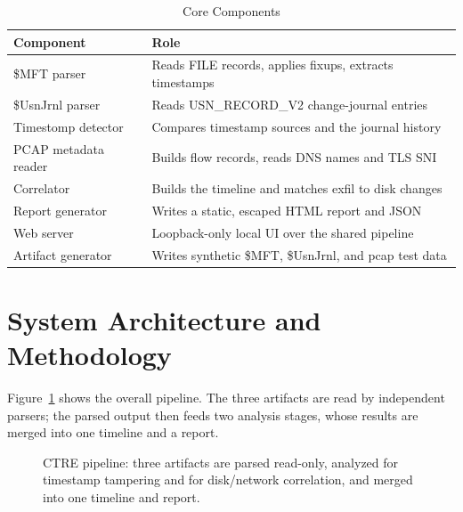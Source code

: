 \documentclass[12pt,onecolumn]{IEEEtran}
\begin{document}
\begin{table}[htbp]
\centering
\caption{Core Components}
\label{tab:stack}
\begin{tabular}{p{} p{}}
\toprule
\textbf{Component} & \textbf{Role} \\
\midrule
\$MFT parser        & Reads FILE records, applies fixups, extracts timestamps \\
\$UsnJrnl parser    & Reads USN\_RECORD\_V2 change-journal entries \\
Timestomp detector  & Compares timestamp sources and the journal history \\
PCAP metadata reader & Builds flow records, reads DNS names and TLS SNI \\
Correlator          & Builds the timeline and matches exfil to disk changes \\
Report generator    & Writes a static, escaped HTML report and JSON \\
Web server          & Loopback-only local UI over the shared pipeline \\
Artifact generator  & Writes synthetic \$MFT, \$UsnJrnl, and pcap test data \\
\bottomrule
\end{tabular}
\end{table}

\section{System Architecture and Methodology}

Figure~\ref{fig:arch} shows the overall pipeline. The three artifacts are read
by independent parsers; the parsed output then feeds two analysis stages, whose
results are merged into one timeline and a report.

\begin{figure}[htbp]
\centering
{}
\caption{CTRE pipeline: three artifacts are parsed read-only, analyzed for
timestamp tampering and for disk/network correlation, and merged into one
timeline and report.}
\label{fig:arch}
\end{figure}
\end{document}
